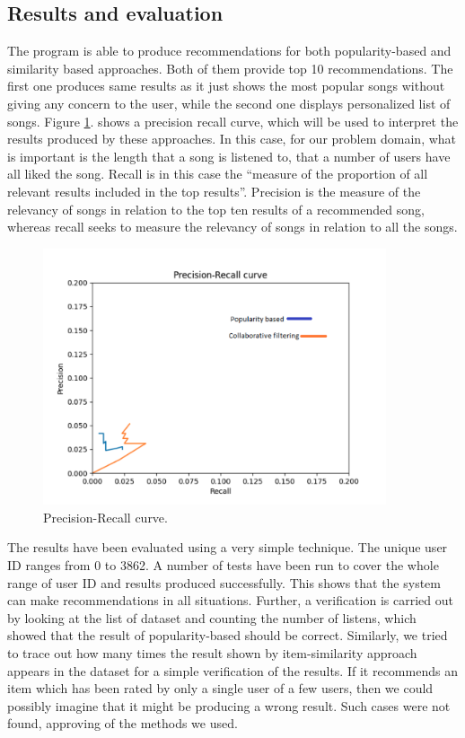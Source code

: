 \documentclass{jot}
\begin{document}
\subsection{Results and evaluation}
The program is able to produce recommendations for both popularity-based and similarity based approaches. Both of them provide top 10 recommendations. The first one produces same results as it just shows the most popular songs without giving any concern to the user, while the second one displays personalized  list of songs.
Figure \ref{fig:evaluation}. shows a precision recall curve, which will be used to interpret the results produced by these approaches. In this case, for our problem domain, what is important is the length that a song is listened to, that a number of users have all liked the song. Recall is in this case the “measure of the proportion of all relevant results included in the top results”. Precision is the measure  of the relevancy of songs in relation to the top ten results of a recommended song, whereas recall seeks to measure the relevancy of songs in relation to all the songs.
\\

\begin{figure}[h!]
    \centering%
    \includegraphics[width=0.9\textwidth]{evaluation}
    \caption{Precision-Recall curve.}
    \label{fig:evaluation}
\end{figure}%

The results have been evaluated using a very simple technique. The unique user ID ranges from 0 to 3862. A number of tests have been run to cover the whole range of user ID and results produced successfully. This shows that the system can make recommendations in all situations. Further, a verification is carried out by looking at the list of dataset and counting the number of listens, which showed that the result of popularity-based should be correct.
Similarly, we tried to trace out how many times the result shown by item-similarity approach appears in the dataset for a simple verification of the results. If it recommends an item which has been rated by only a single user of a few users, then we could possibly imagine that it might be producing a wrong result. Such cases were not found, approving of the methods we used.
\end{document}
